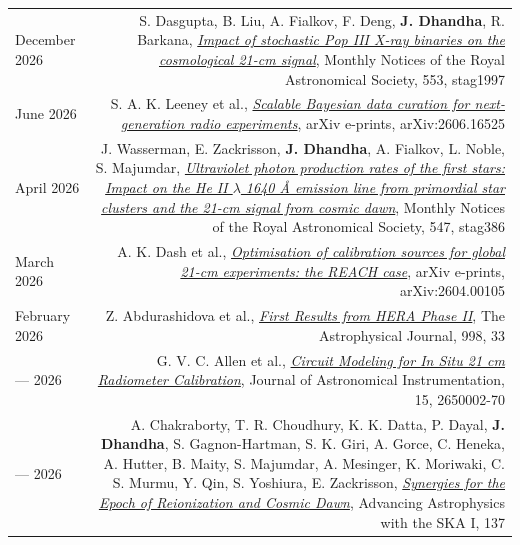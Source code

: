 \documentclass{article}
\begin{document}
\begin{longtable}{L!{\vrule}R}
    December 2026 & S. Dasgupta, B. Liu, A. Fialkov, F. Deng, \textbf{J. Dhandha}, R. Barkana, \href{https://ui.adsabs.harvard.edu/abs/2026MNRAS.553g1997D}{\textit{Impact of stochastic Pop III X-ray binaries on the cosmological 21-cm signal}}, Monthly Notices of the Royal Astronomical Society, 553, stag1997 \\

    June 2026 & S. A. K. Leeney et al., \href{https://ui.adsabs.harvard.edu/abs/2026arXiv260616525L}{\textit{Scalable Bayesian data curation for next-generation radio experiments}}, arXiv e-prints, arXiv:2606.16525 \\

    April 2026 & J. Wasserman, E. Zackrisson, \textbf{J. Dhandha}, A. Fialkov, L. Noble, S. Majumdar, \href{https://ui.adsabs.harvard.edu/abs/2026MNRAS.547ag386W}{\textit{Ultraviolet photon production rates of the first stars: Impact on the He II $\lambda$ 1640 Å emission line from primordial star clusters and the 21-cm signal from cosmic dawn}}, Monthly Notices of the Royal Astronomical Society, 547, stag386 \\

    March 2026 & A. K. Dash et al., \href{https://ui.adsabs.harvard.edu/abs/2026arXiv260400105D}{\textit{Optimisation of calibration sources for global 21-cm experiments: the REACH case}}, arXiv e-prints, arXiv:2604.00105 \\

    February 2026 & Z. Abdurashidova et al., \href{https://ui.adsabs.harvard.edu/abs/2026ApJ...998...33A}{\textit{First Results from HERA Phase II}}, The Astrophysical Journal, 998, 33 \\

    --- 2026 & G. V. C. Allen et al., \href{https://ui.adsabs.harvard.edu/abs/2026JAI....1550002A}{\textit{Circuit Modeling for In Situ 21 cm Radiometer Calibration}}, Journal of Astronomical Instrumentation, 15, 2650002-70 \\

    --- 2026 & A. Chakraborty, T. R. Choudhury, K. K. Datta, P. Dayal, \textbf{J. Dhandha}, S. Gagnon-Hartman, S. K. Giri, A. Gorce, C. Heneka, A. Hutter, B. Maity, S. Majumdar, A. Mesinger, K. Moriwaki, C. S. Murmu, Y. Qin, S. Yoshiura, E. Zackrisson, \href{https://ui.adsabs.harvard.edu/abs/2026aask.bookE.137C}{\textit{Synergies for the Epoch of Reionization and Cosmic Dawn}}, Advancing Astrophysics with the SKA I, 137 \\


\end{longtable}
\end{document}
